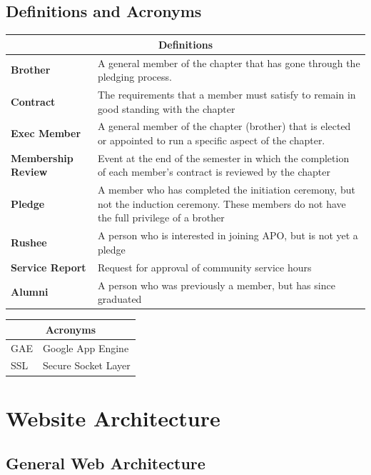 \documentclass{article}
\begin{document}
\subsection{Definitions and Acronyms}

\begin{tabular}{p{}p{}}

\multicolumn{2}{c}{ {\bf Definitions} } \\ \hline
{\bf Brother} & A general member of the chapter that has gone through the pledging process. \\ \hline
{\bf Contract} & The requirements that a member must satisfy to remain in good standing with the chapter \\ \hline
{\bf Exec Member} & A general member of the chapter (brother) that is elected or appointed to run a specific aspect of the chapter. \\ \hline
{\bf Membership Review} & Event at the end of the semester in which the completion of each member's contract is reviewed by the chapter\\ \hline
{\bf Pledge} & A member who has completed the initiation ceremony, but not the induction ceremony. These members do not have the full privilege of a brother\\ \hline
{\bf Rushee} & A person who is interested in joining APO, but is not yet a pledge \\ \hline
{\bf Service Report} & Request for approval of community service hours\\ \hline
{\bf Alumni} & A person who was previously a member, but has since graduated\\ \hline
\end{tabular}

\begin{tabular}{p{}p{}}
\multicolumn{2}{c}{ {\bf Acronyms} } \\ \hline
GAE & Google App Engine \\ \hline
SSL & Secure Socket Layer \\ \hline
\end{tabular}

\section{Website Architecture}

\subsection{General Web Architecture}
\end{document}
